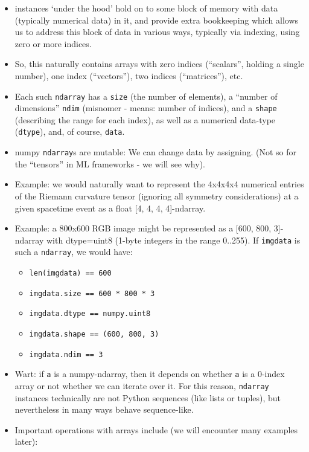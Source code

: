 \documentclass[11pt]{article}
\providecommand{\tightlist}{%
      \setlength{\itemsep}{0pt}\setlength{\parskip}{0pt}}
\begin{document}
\begin{itemize}
\begin{itemize}
    \begin{itemize}
    \item
      instances `under the hood' hold on to some block of memory with
      data (typically numerical data) in it, and provide extra
      bookkeeping which allows us to address this block of data in
      various ways, typically via indexing, using zero or more indices.
    \item
      So, this naturally contains arrays with zero indices (``scalars'',
      holding a single number), one index (``vectors''), two indices
      (``matrices''), etc.
    \item
      Each such \texttt{ndarray} has a \texttt{size} (the number of
      elements), a ``number of dimensions'' \texttt{ndim} (misnomer -
      means: number of indices), and a \texttt{shape} (describing the
      range for each index), as well as a numerical data-type
      (\texttt{dtype}), and, of course, \texttt{data}.
    \item
      numpy \texttt{ndarray}s are mutable: We can change data by
      assigning. (Not so for the ``tensors'' in ML frameworks - we will
      see why).
    \item
      Example: we would naturally want to represent the 4x4x4x4
      numerical entries of the Riemann curvature tensor (ignoring all
      symmetry considerations) at a given spacetime event as a float
      {[}4, 4, 4, 4{]}-ndarray.
    \item
      Example: a 800x600 RGB image might be represented as a {[}600,
      800, 3{]}-ndarray with dtype=uint8 (1-byte integers in the range
      0..255). If \texttt{imgdata} is such a \texttt{ndarray}, we would
      have:

      \begin{itemize}
      \tightlist
      \item
        \texttt{len(imgdata)\ ==\ 600}
      \item
        \texttt{imgdata.size\ ==\ 600\ *\ 800\ *\ 3}
      \item
        \texttt{imgdata.dtype\ ==\ numpy.uint8}
      \item
        \texttt{imgdata.shape\ ==\ (600,\ 800,\ 3)}
      \item
        \texttt{imgdata.ndim\ ==\ 3}
      \end{itemize}
    \item
      Wart: if \texttt{a} is a numpy-ndarray, then it depends on whether
      \texttt{a} is a 0-index array or not whether we can iterate over
      it. For this reason, \texttt{ndarray} instances technically are
      not Python sequences (like lists or tuples), but nevertheless in
      many ways behave sequence-like.
    \item
      Important operations with arrays include (we will encounter many
      examples later):


\end{itemize}
\end{itemize}
\end{itemize}
\end{document}
